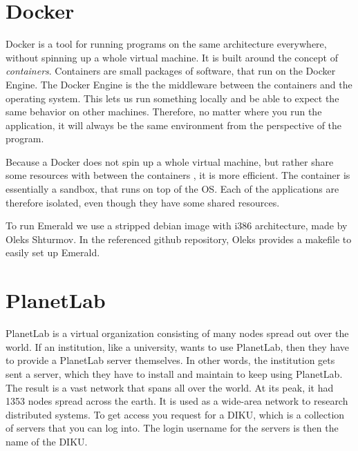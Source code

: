
\section{Docker}\label{background:docker}
Docker is a tool for running programs on the same architecture everywhere, without spinning up a whole virtual machine. It is built around the concept of \textit{containers}. Containers are small packages of software, that run on the Docker Engine. The Docker Engine is the the middleware between the containers and the operating system. This lets us run something locally and be able to expect the same behavior on other machines. Therefore, no matter where you run the application, it will always be the same environment from the perspective of the program. 

Because a Docker does not spin up a whole virtual machine, but rather share some resources with between the containers \cite{dockercom_what_nodate}, it is more efficient. The container is essentially a sandbox, that runs on top of the OS. Each of the applications are therefore isolated, even though they have some shared resources.

To run Emerald we use a stripped debian image with i386 architecture, made by Oleks Shturmov\cite{oleks_oleksdocker-in5570v21_2021}.
In the referenced github repository, Oleks provides a makefile to easily set up Emerald.



\section{PlanetLab}
PlanetLab is a virtual organization consisting of many nodes spread out over the world. If an institution, like a university, wants to use PlanetLab, then they have to provide a PlanetLab server themselves. In other words, the institution gets sent a server, which they have to install and maintain to keep using PlanetLab. The result is a vast network that spans all over the world. At its peak, it had 1353 nodes spread across the earth\cite{noauthor_planetlab_nodate}. It is used as a wide-area network to research distributed systems. To get access you request for a DIKU, which is a collection of servers that you can log into. The login username for the servers is then the name of the DIKU.

